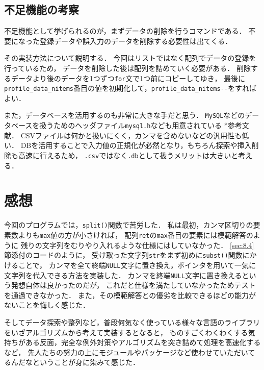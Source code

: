 \documentclass[autodetect-engine,dvi=dvipdfmx,ja=standard,
               a4j,11pt]{bxjsarticle}
\begin{document}

\subsection{不足機能の考察}

不足機能として挙げられるのが，まずデータの削除を行うコマンドである．
不要になった登録データや誤入力のデータを削除する必要性は出てくる．

その実装方法について説明する．
今回はリストではなく配列でデータの登録を行っているため，
データを削除した後は配列を詰めていく必要がある．
削除するデータより後のデータを1つずつ\verb|for|文で1つ前にコピーしてゆき，
最後に\verb|profile_data_nitems|番目の値を初期化して，\verb|profile_data_nitems--|をすればよい．

また，データベースを活用するのも非常に大きな手だと思う．
\verb|MySQL|などのデータベースを扱うためのヘッダファイル\verb|mysql.h|なども用意されている *参考文献\cite{web:mysql}．
CSVファイルは何かと扱いにくく，カンマを含めないなどの汎用性も低い．
DBを活用することで入力値の正規化が必然となり，もちろん探索や挿入削除も高速に行えるため，
\verb|.csv|ではなく\verb|.db|として扱うメリットは大きいと考える．


\section{感想} \label{sec:7}

今回のプログラムでは，\verb|split()|関数で苦労した．
私は最初，カンマ区切りの要素数よりも\verb|max|値の方が小さければ，
配列\verb|ret|の\verb|max|番目の要素には模範解答のように
残りの文字列をむりやり入れるような仕様にはしていなかった．
\ref{sec:8.4}節添付のコードのように，
受け取った文字列\verb|str|をまず初めに\verb|subst()|関数にかけることで，
カンマを全て終端\verb|NULL|文字に置き換え，ポインタを用いて一気に文字列を代入できる方法を実装した．
カンマを終端\verb|NULL|文字に置き換えるという発想自体は良かったのだが，
これだと仕様を満たしていなかったためテストを通過できなかった．
また，その模範解答との優劣を比較できるほどの能力がないことを悔しく感じた．

そしてデータ探索や整列など，普段何気なく使っている様々な言語のライブラリをいざアルゴリズムから考えて実装するとなると，
ものすごくわくわくする気持ちがある反面，完全な例外対策やアルゴリズムを突き詰めて処理を高速化するなど，
先人たちの努力の上にモジュールやパッケージなど使わせていただいてるんだなということが身に染みて感じた．
\end{document}
